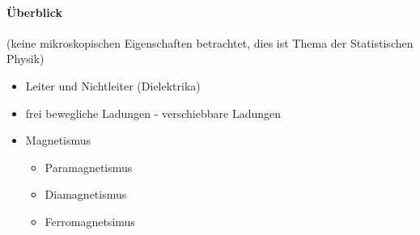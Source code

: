\documentclass[a4paper]{article}
\begin{document}
\paragraph{Überblick}
(keine mikroskopischen Eigenschaften betrachtet, dies ist Thema der
Statistischen Physik)
\begin{itemize}
  \item Leiter und Nichtleiter (Dielektrika)
  \item frei bewegliche Ladungen - verschiebbare Ladungen
  \item Magnetismus
  	\begin{itemize}
  		\item Paramagnetismus
  		\item Diamagnetismus
  		\item Ferromagnetsimus 
	\end{itemize} 
\end{itemize}
\end{document}
